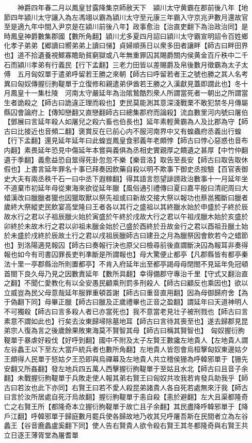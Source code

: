 　　神爵四年春二月以鳳皇甘露降集京師赦天下　潁川太守黄霸在郡前後八年【地節四年潁川太守讓入為左馮翊以霸為潁川太守至元康三年霸入守京兆尹數月還故官至是適九年中間入尹京是在潁川前後八年】政事愈治【治直吏翻下為治政治同】是時鳳皇神爵數集郡國【數所角翻】潁川尤多夏四月詔曰潁川太守霸宣明詔令百姓鄉化孝子弟弟【郷讀曰嚮弟弟上讀曰悌】貞婦順孫日以衆多田者讓畔【師古曰畔田界也】道不拾遺養視鰥寡贍助貧窮獄或八年無重罪囚其賜爵關内侯黄金百斤秩中二千石而潁川孝弟有行義民【行下孟翻】三老力田皆以差賜爵及帛後數月徵霸為太子太傅　五月匈奴單于遣弟呼留若王勝之來朝【師古曰呼留若者王之號也勝之其人名考異曰匈奴傳握衍朐鞮單于立復修和親遣弟伊酋若王勝之入漢獻見蓋即謂此也】冬十月鳳皇十一集杜陵　河南太守嚴延年為治隂鷙酷烈衆人所謂當死者一朝出之所謂當生者詭殺之【師古曰詭違正理而殺也】吏民莫能測其意深淺戰栗不敢犯禁冬月傳屬縣囚會論府上【傳知戀翻又直戀翻師古曰總集郡府而論殺】流血數里河内號曰屠伯【鄧展曰言延年殺人如屠兒之殺六畜也伯長也】延年素輕黄霸為人及比郡為守【師古曰比接近也音頻二翻】褒賞反在已前心内不服河南界中又有蝗蟲府丞義出行蝗【行下孟翻】還見延年延年曰此蝗豈鳳皇食邪義年老頗悖【師古曰悖心惡惑也音布内翻】素畏延年恐見中傷延年本嘗與義俱為丞相史實親厚之饋遺之甚厚【中竹仲翻遺于季翻】義愈益恐自筮得死卦忽忽不樂【樂音洛】取告至長安【師古曰取告取休假也】上書言延年罪名十事已拜奏因飲藥自殺以明不欺事下御史丞按驗【百官表御史大夫有兩丞秩千石一曰中丞下遐稼翻】得其語言怨望誹謗政治數事十一月延年坐不道棄市初延年母從東海來欲從延年臘【風俗通引禮傳曰夏曰嘉平殷曰清祀周曰大蜡漢改曰臘臘者獵也因獵取獸以祭先祖或曰新故交接大祭以報功也蔡邕獨斷曰臘者歲終大祭縱吏民飲宴高堂隆曰王者各以其行之盛祖以其終臘水始於申盛於子終於辰故水行之君以子祖辰臘火始於寅盛於午終於戌故大行之君以午祖戌臘木始於亥盛於卯終於未故木行之君以卯祖未臘金始於己盛於酉終於丑故金行之君以酉祖丑臘土始於未盛於戌終於辰故土行之君以戌祖辰臘師古曰建丑之月為臘祭因會飲若今之蜡節也】到洛陽適見報囚【師古曰奏報行決也原父曰檢尋前後直謂斷决囚為報耳非奏得報也如今有司書囚罪長吏判凖斷是所謂報也】母大驚便止都亭【凡郡縣皆有都亭秦法十里一亭郡縣治所則置都亭】不肯入府延年出至都亭謁母母閉閤不見延年免冠頓首閤下良久母乃見之因數責延年【數所具翻】幸得備郡守專治千里【守式又翻治直之翻】不聞仁愛教化有以全安愚民顧乘刑罰多刑殺人【師古曰顧反也乘因也】欲以立威豈為民父母意哉延年服罪重頓首謝【師古曰重音直用翻】因為母御歸府舍【為于偽翻下同】母畢正臘【師古曰臘及正歲禮畢也正音之盈翻】謂延年曰天道神明人不可獨殺【師古曰言多殺人者已亦當死也】我不意當老見壮子被刑戮也【師古曰言素意不謂如此也】行矣去汝東歸埽除墓地耳【師古曰言待其喪至也】遂去歸郡見昆弟宗人復為言之後歲餘果敗東海莫不賢智其母【師古曰稱其賢智也】　匈奴握衍朐鞮單于暴虐好殺伐【好呼到翻】國中不附及太子左賢王數讒左地貴人【左地貴人謂左谷蠡王以下至左大當戶統兵者也數所角翻】左地貴人皆怨會烏桓擊匈奴東邊姑夕王頗得人民單于怒姑夕王恐即與烏禪幕及左地貴人共立稽侯㹪為呼韓邪單于【㹪先安翻又所姦翻】發左地兵四五萬人西擊握衍朐鞮單于至姑且水北【師古曰且音子余翻】未戰握衍朐鞮單于兵敗走使人報其弟右賢王曰匈奴共攻我若肯發兵助我乎【師古曰若汝也此下亦同】右賢王曰若不愛人殺昆弟諸貴人各自死若處無來汙我【師古曰言於汝所居處自死汙烏故翻】握衍朐鞮單于恚自殺【恚於避翻】左大且渠都隆奇亡之右賢王所【都隆奇本立握衍朐鞮單于故亡且子余翻】其民盡降呼韓邪單于【降戶江翻】呼韓邪單于歸庭數月罷兵使各歸故地乃收其兄呼屠吾斯在民間者立為左谷蠡王【谷音鹿蠡盧奚翻下同】使人告右賢貴人欲令殺右賢王其冬都隆奇與右賢王共立日逐王薄胥堂為屠耆單